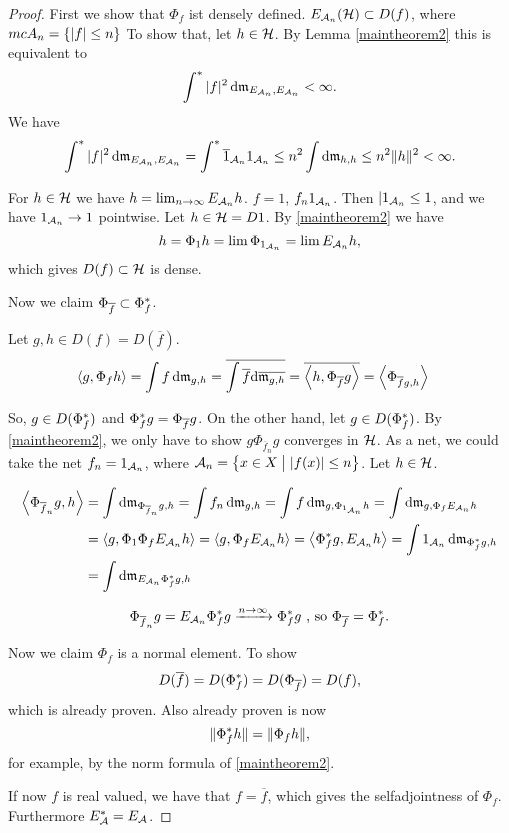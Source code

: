 \begin{proof}

First we show that $\Phi_f$ ist densely defined. 
$E_{\mathcal{A}_n}(\mathcal{H}) \subset D(f)$, where $mc{A}_n = \left\lbrace |f| \leq n \right\rbrace$
To show that, let $h \in \mathcal{H}$. By Lemma \ref{maintheorem2} this is
equivalent to 
\[
\int ^{*} |f|^2 \operatorname{d}\! \mathfrak{m}_{E_{\mathcal{A}_n}, E_{\mathcal{A}_n}} < \infty.
\]
We have 
\begin{align*}
  \int ^{*} |f|^2 \operatorname{d}\! \mathfrak{m}_{E_{\mathcal{A}_n}, E_{\mathcal{A}_n}} = 
  \int ^{*} \overline{1}_{\mathcal{A}_n} 1_{\mathcal{A}_n} \leq
  n^2 \int \operatorname{d}\! \mathfrak{m}_{h,h} \leq n^2 \| h\|^2 < \infty.
\end{align*}

For $h \in \mathcal{H}$ we have $h = \lim_{n \to \infty} E_{\mathcal{A}_n} h$. 
$f = 1$, $f_n 1_{\mathcal{A}_n}$. Then $|1_{\mathcal{A}_n} \leq 1$, and we have
$1_{\mathcal{A}_n} \to 1 $ pointwise.
Let $h \in \mathcal{H} = D{1}$. By \ref{maintheorem2} we have
\[
h = \Phi_1 h = \lim \Phi_{1_{\mathcal{A}_n}} = \lim E_{\mathcal{A}_n} h , 
\]
which gives $D(f) \subset \mathcal{H}$ is dense. 

Now we claim $ \Phi_{\overline{f}} \subset \Phi_f ^{*}$.

Let  $g,h \in D(f) = D(\overline{f})$.
\begin{align*}
  \left\langle g, \Phi_f h \right\rangle &= \int f \operatorname{d}\! \mathfrak{m}_{g,h} 
  = \overline{ \int \overline{f} \text{d}\overline{\mathfrak{m}_{g,h}}} 
  = \overline{ \left\langle h , \Phi_{\overline{f}} g  \right\rangle} 
  = \left\langle \Phi_{\overline{f} g , h} \right\rangle
\end{align*}

So, $g \in D(\Phi_f ^{*})$ and $\Phi_f ^{*} g = \Phi_{\overline{f}} g$.
On the other hand, let $g\in D(\Phi_f ^{*})$.
By \ref{maintheorem2}, we only have to show $g \Phi_{\overline{f}_n}g$
converges in $\mathcal{H}$. As a net, we could take the net $f_n = 1_{\mathcal{A}_n}$,
where $\mathcal{A}_n = \left\lbrace x \in X \bigm | | f(x) | \leq n \right\rbrace$.
Let $h \in \mathcal{H}$.

\begin{align*}
\left\langle  \Phi_{\overline{f}_n} g, h  \right\rangle& = \int \operatorname{d}\! \mathfrak{m}_{\Phi_{\overline{f}_n} g, h}
= \int f_n \operatorname{d}\! \mathfrak{m}_{g,h} 
= \int f \operatorname{d}\! \mathfrak{m}_{g, \Phi_{1_{\mathcal{A}_n }} h }
= \int \operatorname{d}\! \mathfrak{m}_{g, \Phi_f E_{\mathcal{A}_n} h} \\
&= \left\langle g, \Phi_1 \Phi_f E_{\mathcal{A}_n }h  \right\rangle
= \left\langle g, \Phi_f E_{\mathcal{A}_n} h \right\rangle 
= \left\langle \Phi_f ^{*} g, E_{\mathcal{A}_n} h \right\rangle
= \int 1_{\mathcal{A}_n} \operatorname{d}\! \mathfrak{m}_{\Phi_f ^{*} g, h}\\
&= \int \operatorname{d}\! \mathfrak{m}_{E_{\mathcal{A}_n} \Phi_f ^{*} g, h}
\end{align*}

\[
\Phi_{\overline{f}_n} g = E_{\mathcal{A}_n} \Phi_f ^{*} g 
\xrightarrow{n \to \infty} \Phi_f ^{*} g \text{ , so  }
\Phi_{\overline{f}} = \Phi_f ^{*}.
\]


Now we claim $\Phi_f$ is a normal element. To show
\[
D(\overline{f}) = D(\Phi_f ^{*}) = D(\Phi_{\overline{f}}) = D(f),
\]
 which is already proven. Also already proven is now
\[
 \| \Phi_f ^{*} h \| = \| \Phi_f h \|,
\]
for example, by the norm formula of \ref{maintheorem2}.

If now $f$ is real valued, we have that $f = \overline{f}$, which gives 
the selfadjointness of $\Phi_f$. Furthermore $E_\mathcal{A} ^{*} = E_\mathcal{A}$.

\end{proof}
